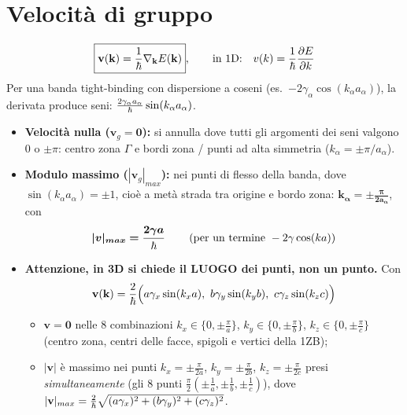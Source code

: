 \newpage

\section{Velocità di gruppo}
\[ \boxed{\mathbf{v}(\mathbf{k}) = \frac{1}{\hbar}\nabla_{\mathbf{k}} E(\mathbf{k})}, \qquad\text{in 1D:}\quad v(k)=\frac{1}{\hbar}\frac{\partial E}{\partial k} \]
Per una banda tight-binding con dispersione a coseni (es.\ $-2\gamma_\alpha\cos(k_\alpha a_\alpha)$), la derivata produce seni: $\frac{2\gamma_\alpha a_\alpha}{\hbar}\sin(k_\alpha a_\alpha)$.
\begin{itemize}
    \item \textbf{Velocità nulla ($\mathbf{v}_g=\mathbf{0}$):} si annulla dove tutti gli argomenti dei seni valgono $0$ o $\pm\pi$: centro zona $\Gamma$ e bordi zona / punti ad alta simmetria ($k_\alpha=\pm\pi/a_\alpha$).
    \item \textbf{Modulo massimo ($|\mathbf{v}_g|_{max}$):} nei punti di flesso della banda, dove $\sin(k_\alpha a_\alpha)=\pm1$, cioè a metà strada tra origine e bordo zona: $\bm{k_\alpha = \pm\frac{\pi}{2a_\alpha}}$, con
    \[ \bm{|v|_{max} = \frac{2\gamma a}{\hbar}} \qquad\left(\text{per un termine } -2\gamma\cos(ka)\right) \]
    \item \textbf{Attenzione, in 3D si chiede il LUOGO dei punti, non un punto.} Con
    \[ \mathbf{v}(\kvec)=\frac{2}{\hbr}\Big(a\gamma_x\sin(k_xa),\ b\gamma_y\sin(k_yb),\ c\gamma_z\sin(k_zc)\Big) \]
    \begin{itemize}
      \item $\mathbf{v}=\mathbf{0}$ nelle 8 combinazioni $k_x\in\{0,\pm\frac\pi a\}$, $k_y\in\{0,\pm\frac\pi b\}$, $k_z\in\{0,\pm\frac\pi c\}$ (centro zona, centri delle facce, spigoli e vertici della 1ZB);
      \item $|\mathbf{v}|$ è massimo nei punti $k_x=\pm\frac{\pi}{2a}$, $k_y=\pm\frac{\pi}{2b}$, $k_z=\pm\frac{\pi}{2c}$ presi \emph{simultaneamente} (gli 8 punti $\frac{\pi}{2}(\pm\frac1a,\pm\frac1b,\pm\frac1c)$), dove $|\mathbf{v}|_{max}=\frac{2}{\hbar}\sqrt{(a\gamma_x)^2+(b\gamma_y)^2+(c\gamma_z)^2}$.
    \end{itemize}
\end{itemize}

\vspace{0.3cm}

